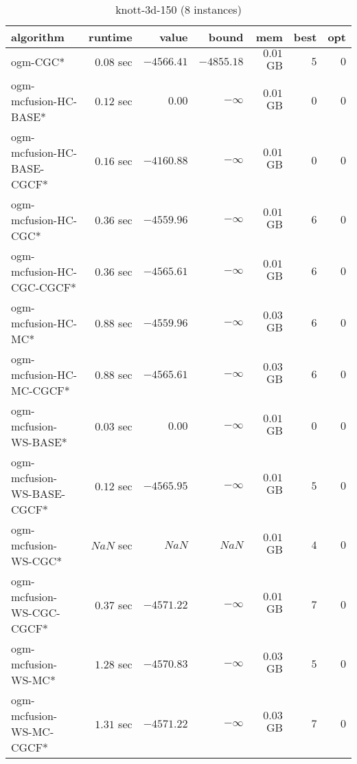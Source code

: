 \begin{table}[H]
\tiny
\centering
\caption{knott-3d-150 (8 instances)}
\label{tab:smalltable-knott-3d-150}
\begin{tabular}{lrrrrrr}
\toprule
           algorithm &       runtime     &         value &         bound &           mem &     best &      opt   \\ \midrule 
            ogm-CGC* & $         0.08$ sec & $     -4566.41$ & $     -4855.18$ & $         0.01$ GB & $       5$ & $       0$ \\ 
ogm-mcfusion-HC-BASE* & $         0.12$ sec & $         0.00$ & $-\infty$ & $         0.01$ GB & $       0$ & $       0$ \\ 
ogm-mcfusion-HC-BASE-CGCF* & $         0.16$ sec & $     -4160.88$ & $-\infty$ & $         0.01$ GB & $       0$ & $       0$ \\ 
ogm-mcfusion-HC-CGC* & $         0.36$ sec & $     -4559.96$ & $-\infty$ & $         0.01$ GB & $       6$ & $       0$ \\ 
ogm-mcfusion-HC-CGC-CGCF* & $         0.36$ sec & $     -4565.61$ & $-\infty$ & $         0.01$ GB & $       6$ & $       0$ \\ 
 ogm-mcfusion-HC-MC* & $         0.88$ sec & $     -4559.96$ & $-\infty$ & $         0.03$ GB & $       6$ & $       0$ \\ 
ogm-mcfusion-HC-MC-CGCF* & $         0.88$ sec & $     -4565.61$ & $-\infty$ & $         0.03$ GB & $       6$ & $       0$ \\ 
ogm-mcfusion-WS-BASE* & $         0.03$ sec & $         0.00$ & $-\infty$ & $         0.01$ GB & $       0$ & $       0$ \\ 
ogm-mcfusion-WS-BASE-CGCF* & $         0.12$ sec & $     -4565.95$ & $-\infty$ & $         0.01$ GB & $       5$ & $       0$ \\ 
ogm-mcfusion-WS-CGC* & $          NaN$ sec & $          NaN$ & $          NaN$ & $         0.01$ GB & $       4$ & $       0$ \\ 
ogm-mcfusion-WS-CGC-CGCF* & $         0.37$ sec & $     -4571.22$ & $-\infty$ & $         0.01$ GB & $       7$ & $       0$ \\ 
 ogm-mcfusion-WS-MC* & $         1.28$ sec & $     -4570.83$ & $-\infty$ & $         0.03$ GB & $       5$ & $       0$ \\ 
ogm-mcfusion-WS-MC-CGCF* & $         1.31$ sec & $     -4571.22$ & $-\infty$ & $         0.03$ GB & $       7$ & $       0$ \\ 
\bottomrule
\end{tabular}
\end{table}